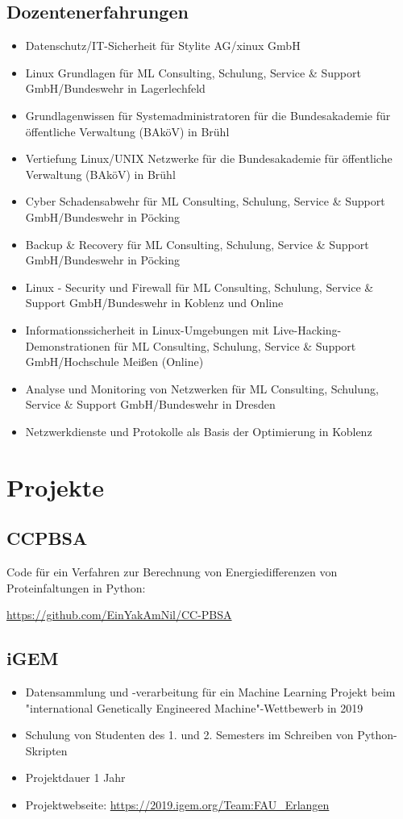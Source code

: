 \documentclass{article}
\begin{document}
\subsection{Dozentenerfahrungen}

\begin{itemize}
\item Datenschutz/IT-Sicherheit für Stylite AG/xinux GmbH
\item Linux Grundlagen für ML Consulting, Schulung, Service \& Support GmbH/Bundeswehr in Lagerlechfeld
\item Grundlagenwissen für Systemadministratoren für die Bundesakademie für öffentliche Verwaltung (BAköV) in Brühl
\item Vertiefung Linux/UNIX Netzwerke für die Bundesakademie für öffentliche Verwaltung (BAköV) in Brühl
\item Cyber Schadensabwehr für ML Consulting, Schulung, Service \& Support GmbH/Bundeswehr in Pöcking
\item Backup \& Recovery für ML Consulting, Schulung, Service \& Support GmbH/Bundeswehr in Pöcking
\item Linux - Security und Firewall für ML Consulting, Schulung, Service \& Support GmbH/Bundeswehr in Koblenz und Online
\item Informationssicherheit in Linux-Umgebungen mit Live-Hacking-Demonstrationen für ML Consulting, Schulung, Service \& Support GmbH/Hochschule Meißen (Online)
\item Analyse und Monitoring von Netzwerken für ML Consulting, Schulung, Service \& Support GmbH/Bundeswehr in Dresden
\item Netzwerkdienste und Protokolle als Basis der Optimierung in Koblenz
\end{itemize}

\section{Projekte}

\subsection{CCPBSA}
Code für ein Verfahren zur Berechnung von Energiedifferenzen von Proteinfaltungen in Python:

\href{https://github.com/EinYakAmNil/CC-PBSA}{https://github.com/EinYakAmNil/CC-PBSA}

\subsection{iGEM}
\begin{itemize}
\item Datensammlung und -verarbeitung für ein Machine Learning Projekt beim "international Genetically Engineered Machine"-Wettbewerb in 2019
\item Schulung von Studenten des 1. und 2. Semesters im Schreiben von Python-Skripten
\item Projektdauer 1 Jahr
\item Projektwebseite: \href{https://2019.igem.org/Team:FAU_Erlangen}{https://2019.igem.org/Team:FAU\_Erlangen}
\end{itemize}
\end{document}
